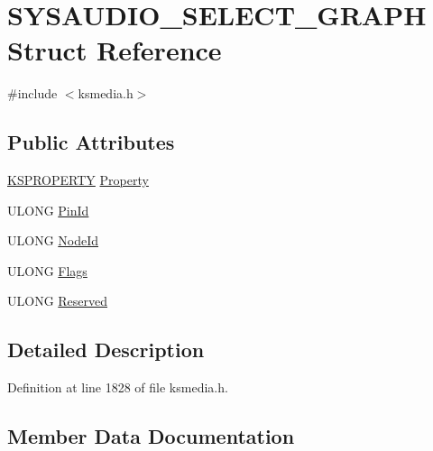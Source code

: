 \hypertarget{struct_s_y_s_a_u_d_i_o___s_e_l_e_c_t___g_r_a_p_h}{}\section{S\+Y\+S\+A\+U\+D\+I\+O\+\_\+\+S\+E\+L\+E\+C\+T\+\_\+\+G\+R\+A\+PH Struct Reference}
\label{struct_s_y_s_a_u_d_i_o___s_e_l_e_c_t___g_r_a_p_h}


{\ttfamily \#include $<$ksmedia.\+h$>$}

\subsection*{Public Attributes}
\begin{DoxyCompactItemize}
\item 
\hyperlink{ks_8h_a4392f77c74e868d813d46c39ada4d660}{K\+S\+P\+R\+O\+P\+E\+R\+TY} \hyperlink{struct_s_y_s_a_u_d_i_o___s_e_l_e_c_t___g_r_a_p_h_a0586ee0a0cc7628dbf30915ad53eab50}{Property}
\item 
U\+L\+O\+NG \hyperlink{struct_s_y_s_a_u_d_i_o___s_e_l_e_c_t___g_r_a_p_h_a01e0e455558651e05ea85021b4686120}{Pin\+Id}
\item 
U\+L\+O\+NG \hyperlink{struct_s_y_s_a_u_d_i_o___s_e_l_e_c_t___g_r_a_p_h_a7b44821d351bc79d90925ed91682bf37}{Node\+Id}
\item 
U\+L\+O\+NG \hyperlink{struct_s_y_s_a_u_d_i_o___s_e_l_e_c_t___g_r_a_p_h_a6f6e20aa9cb3f6e463407bc70e4a0921}{Flags}
\item 
U\+L\+O\+NG \hyperlink{struct_s_y_s_a_u_d_i_o___s_e_l_e_c_t___g_r_a_p_h_a6812370b5f37ef5eaff3f915e53afa0e}{Reserved}
\end{DoxyCompactItemize}


\subsection{Detailed Description}


Definition at line 1828 of file ksmedia.\+h.



\subsection{Member Data Documentation}
